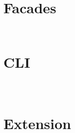 \begin{lstlisting}[language=PHP]

\end{lstlisting}

\chapter{Facades}


\begin{lstlisting}[language=PHP]

\end{lstlisting}



\begin{lstlisting}[language=PHP]

\end{lstlisting}

\chapter{CLI}

\begin{lstlisting}[language=PHP]

\end{lstlisting}



\begin{lstlisting}[language=PHP]

\end{lstlisting}




\begin{lstlisting}[language=PHP]

\end{lstlisting}

\chapter{Extension}

\begin{lstlisting}[language=PHP]

\end{lstlisting}




\begin{lstlisting}[language=PHP]

\end{lstlisting}



\begin{lstlisting}[language=PHP]

\end{lstlisting}


